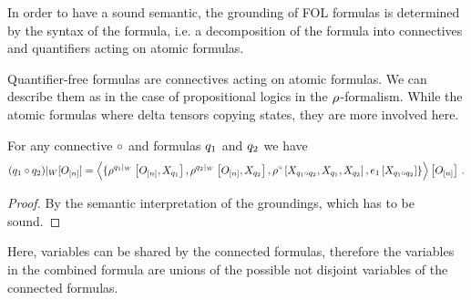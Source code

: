 %		




In order to have a sound semantic, the grounding of FOL formulas is determined by the syntax of the formula, i.e. a decomposition of the formula into connectives and quantifiers acting on atomic formulas.

Quantifier-free formulas are connectives acting on atomic formulas.
We can describe them as in the case of propositional logics in the $\rho^{}$-formalism.
While the atomic formulas where delta tensors copying states, they are more involved here.



\begin{theorem}
	For any connective $\circ$ and formulas $q_1$ and $q_2$ we have
	\begin{align}
		{(q_1\circ q_2)}|_{W}[O_{[n]}] = 
			\left\langle \{
			\rho^{{q_1}|_{W}}\left[O_{[n]},X_{q_1}\right],
			\rho^{{q_2}|_{W}}\left[O_{[n]},X_{q_2}\right],
			\rho^{\circ}\left[X_{q_1\circ q_2}, X_{q_1}, X_{q_2}\right], 
			e_{1}\left[X_{q_1\circ q_2}\right]			
			\}\right\rangle \left[ O_{[n]} \right] \, . 
	\end{align}
\end{theorem}
\begin{proof}
	By the semantic interpretation of the groundings, which has to be sound.
\end{proof}

Here, variables can be shared by the connected formulas, therefore the variables in the combined formula are unions of the possible not disjoint variables of the connected formulas.


